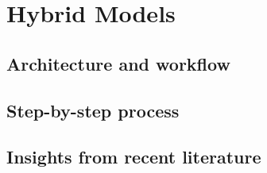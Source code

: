 
\chapter{Hybrid Models}
\label{cha:Hybrid Models}

\section{Architecture and workflow}
\label{sec:Architecture and workflow}

\section{Step-by-step process}
\label{sec:Step-by-step process}

\section{Insights from recent literature}
\label{sec:Insights from recent literature}